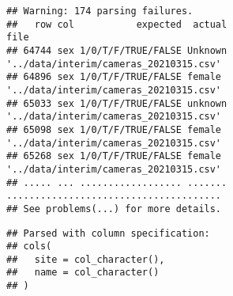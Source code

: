 \documentclass[
]{article}
\newenvironment{Shaded}{\begin{snugshade}}{\end{snugshade}}
\newcommand{\CommentTok}[1]{\textcolor[rgb]{0.56,0.35,0.01}{\textit{#1}}}
\newcommand{\KeywordTok}[1]{\textcolor[rgb]{0.13,0.29,0.53}{\textbf{#1}}}
\newcommand{\NormalTok}[1]{#1}
\newcommand{\OperatorTok}[1]{\textcolor[rgb]{0.81,0.36,0.00}{\textbf{#1}}}
\newcommand{\StringTok}[1]{\textcolor[rgb]{0.31,0.60,0.02}{#1}}
\begin{document}
\begin{verbatim}
## Warning: 174 parsing failures.
##   row col           expected  actual                                   file
## 64744 sex 1/0/T/F/TRUE/FALSE Unknown '../data/interim/cameras_20210315.csv'
## 64896 sex 1/0/T/F/TRUE/FALSE female  '../data/interim/cameras_20210315.csv'
## 65033 sex 1/0/T/F/TRUE/FALSE unknown '../data/interim/cameras_20210315.csv'
## 65098 sex 1/0/T/F/TRUE/FALSE female  '../data/interim/cameras_20210315.csv'
## 65268 sex 1/0/T/F/TRUE/FALSE female  '../data/interim/cameras_20210315.csv'
## ..... ... .................. ....... ......................................
## See problems(...) for more details.
\end{verbatim}

\begin{Shaded}
\end{Shaded}

\begin{verbatim}
## Parsed with column specification:
## cols(
##   site = col_character(),
##   name = col_character()
## )
\end{verbatim}
\end{document}
